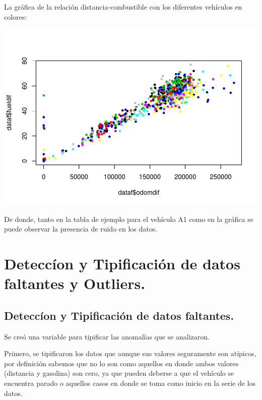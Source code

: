 \documentclass[]{article}
\newenvironment{Shaded}{\begin{snugshade}}{\end{snugshade}}
\newcommand{\KeywordTok}[1]{\textcolor[rgb]{0.13,0.29,0.53}{\textbf{#1}}}
\newcommand{\DataTypeTok}[1]{\textcolor[rgb]{0.13,0.29,0.53}{#1}}
\newcommand{\DecValTok}[1]{\textcolor[rgb]{0.00,0.00,0.81}{#1}}
\newcommand{\OperatorTok}[1]{\textcolor[rgb]{0.81,0.36,0.00}{\textbf{#1}}}
\newcommand{\NormalTok}[1]{#1}
\begin{document}
La gráfica de la relación distancia-combustible con los diferentes
vehículos en colores:

\begin{Shaded}
\end{Shaded}

\includegraphics{practica1_files/figure-latex/unnamed-chunk-7-1.pdf}

De donde, tanto en la tabla de ejemplo para el vehículo A1 como en la
gráfica se puede observar la presencia de ruido en los datos.

\section{Deteccíon y Tipificación de datos faltantes y
Outliers.}\label{deteccion-y-tipificacion-de-datos-faltantes-y-outliers.}

\subsection{Deteccíon y Tipificación de datos
faltantes.}\label{deteccion-y-tipificacion-de-datos-faltantes.}

Se creó una variable para tipificar las anomalías que se analizaron.

Primero, se tipificaron los datos que aunque sus valores seguramente son
atípicos, por definición sabemos que no lo son como aquellos en donde
ambos valores (distancia y gasolina) son cero, ya que pueden deberse a
que el vehículo se encuentra parado o aquellos casos en donde se toma
como inicio en la serie de los datos.
\end{document}
